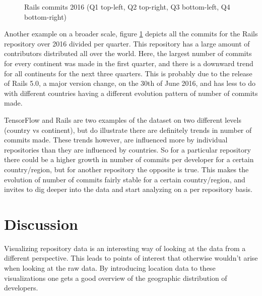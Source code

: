 \documentclass[acmtog, authorversion]{acmart}
\begin{document}
\begin{figure}
\caption{Rails commits 2016 (Q1 top-left, Q2 top-right, Q3 bottom-left, Q4 bottom-right)}
\label{fig:rails-2016}
\end{figure}

Another example on a broader scale, figure \ref{fig:rails-2016} depicts all the commits for the Rails \cite{Rails} repository over 2016 divided per quarter.
This repository has a large amount of contributors distributed all over the world.
Here, the largest number of commits for every continent was made in the first quarter, and there is a downward trend for all continents for the next three quarters.
This is probably due to the release of Rails 5.0, a major version change, on the 30th of June 2016, and has less to do with different countries having a different evolution pattern of number of commits made.

TensorFlow and Rails are two examples of the dataset on two different levels (country vs continent), but do illustrate there are definitely trends in number of commits made.
These trends however, are influenced more by individual repositories than they are influenced by countries.
So for a particular repository there could be a higher growth in number of commits per developer for a certain country/region, but for another repository the opposite is true.
This makes the evolution of number of commits fairly stable for a certain country/region, and invites to dig deeper into the data and start analyzing on a per repository basis.

\FloatBarrier
\cleardoublepage
\section{Discussion}
Visualizing repository data is an interesting way of looking at the data from a different perspective.
This leads to points of interest that otherwise wouldn't arise when looking at the raw data.
By introducing location data to these visualizations one gets a good overview of  the geographic distribution of developers.
\end{document}
